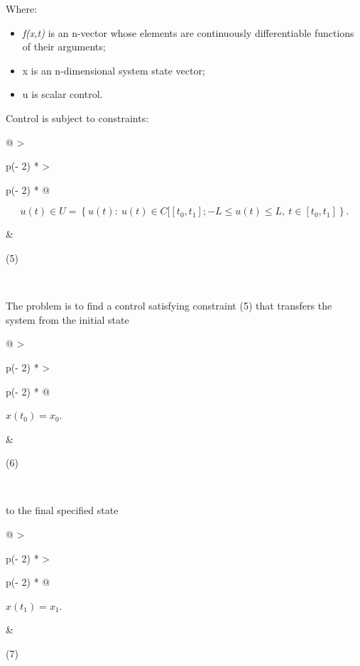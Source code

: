 Where:

\begin{itemize}
\item
  \emph{f(x,t)} is an n-vector whose elements are continuously
  differentiable functions of their arguments;
\item
  x is an n-dimensional system state vector;
\item
  u is scalar control.
\end{itemize}

Control is subject to constraints:

\begin{longtable}[]{@{}
  >{\raggedright\arraybackslash}p{(\columnwidth - 2\tabcolsep) * }
  >{\raggedright\arraybackslash}p{(\columnwidth - 2\tabcolsep) * }@{}}
\begin{minipage}[b]{\linewidth}\raggedright
\[u(t) \in U = \left\{ u(t):\ u(t) \in C\lbrack\left\lbrack t_{0},t_{1} \right\rbrack; - L \leq u(t) \leq L,\ t \in \left\lbrack t_{0},t_{1} \right\rbrack \right\}.\]
\end{minipage} & \begin{minipage}[b]{\linewidth}\raggedright
(5)
\end{minipage} \\
\end{longtable}

The problem is to find a control satisfying constraint (5) that
transfers the system from the initial state

\begin{longtable}[]{@{}
  >{\raggedright\arraybackslash}p{(\columnwidth - 2\tabcolsep) * }
  >{\raggedright\arraybackslash}p{(\columnwidth - 2\tabcolsep) * }@{}}
\begin{minipage}[b]{\linewidth}\raggedright
\(x\left( t_{0} \right) = x_{0}\).
\end{minipage} & \begin{minipage}[b]{\linewidth}\raggedright
(6)
\end{minipage} \\
\end{longtable}

to the final specified state

\begin{longtable}[]{@{}
  >{\raggedright\arraybackslash}p{(\columnwidth - 2\tabcolsep) * }
  >{\raggedright\arraybackslash}p{(\columnwidth - 2\tabcolsep) * }@{}}
\begin{minipage}[b]{\linewidth}\raggedright
\(x\left( t_{1} \right) = x_{1}\).
\end{minipage} & \begin{minipage}[b]{\linewidth}\raggedright
(7)
\end{minipage} \\
\end{longtable}

